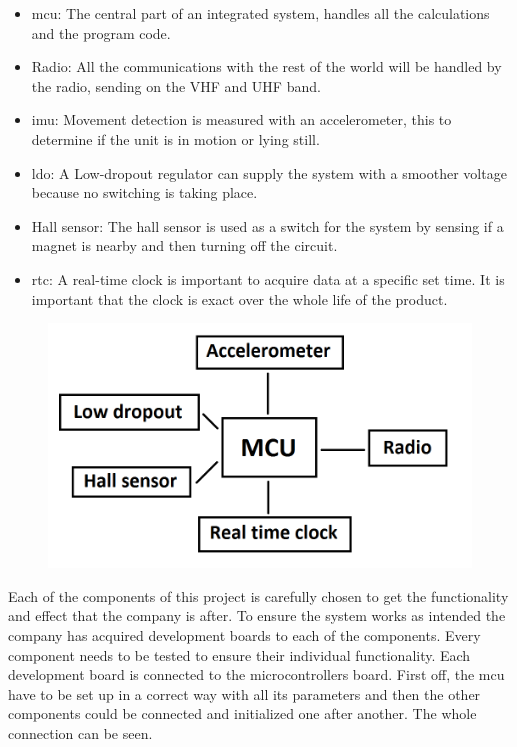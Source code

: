 \begin{itemize}[noitemsep] 
\item \gls{mcu}: The central part of an integrated system, handles all the calculations and the program code.
\item Radio: All the communications with the rest of the world will be handled by the radio, sending on the VHF and UHF band.
\item \gls{imu}: Movement detection is measured with an accelerometer, this to determine if the unit is in motion or lying still. 
\item \gls{ldo}: A Low-dropout regulator can supply the system with a smoother voltage because no switching is taking place.
\item Hall sensor: The hall sensor is used as a switch for the system by sensing if a magnet is nearby and then turning off the circuit.
\item \gls{rtc}: A real-time clock is important to acquire data at a specific set time. It is important that the clock is exact over the whole life of the product.
\end{itemize} 


\begin{figure}[H] 
	\centering 
	\includegraphics[width=.8\linewidth]{Figures/System_diagram} 
	\label{fig:sys_dia} 
\end{figure} 

Each of the components of this project is carefully chosen to get the functionality and effect that the company is after. To ensure the system works as intended the company has acquired development boards to each of the components. Every component needs to be tested to ensure their individual functionality. Each development board is connected to the microcontrollers board. First off, the \gls{mcu} have to be set up in a correct way with all its parameters and then the other components could be connected and initialized one after another. The whole connection can be seen. %

